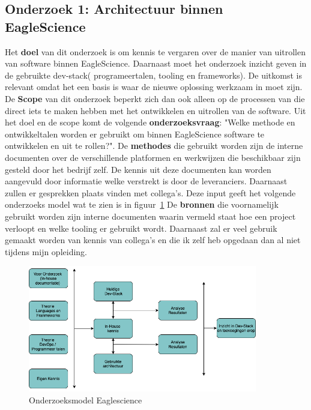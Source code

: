 \subsection{Onderzoek 1: Architectuur binnen EagleScience}\label{sec:onderzoeksmethode-architectuur-binnen-eaglescience}
Het \textbf{doel} van dit onderzoek is om kennis te vergaren over de manier van uitrollen van software binnen EagleScience. Daarnaast moet het onderzoek inzicht geven in de gebruikte dev-stack( programeertalen, tooling en frameworks). De uitkomst is relevant omdat het een basis is waar de nieuwe oplossing werkzaam in moet zijn. De \textbf{Scope} van dit onderzoek beperkt zich dan ook alleen op de processen van die direct iets te maken hebben met het ontwikkelen en uitrollen van de software. Uit het doel en de scope komt de volgende \textbf{onderzoeksvraag}: "Welke methode en ontwikkeltalen worden er gebruikt om binnen EagleScience software te ontwikkelen en uit te rollen?". De \textbf{methodes} die gebruikt worden zijn de interne documenten over de verschillende platformen en werkwijzen die beschikbaar zijn gesteld door het bedrijf zelf. De kennis uit deze documenten kan worden aangevuld door informatie welke verstrekt is door de leveranciers. Daarnaast zullen er gesprekken plaats vinden met collega's. Deze input geeft het volgende onderzoeks model wat te zien is in figuur~\ref{fig:OnderzoeksModelEaglescience}
De \textbf{bronnen} die voornamelijk gebruikt worden zijn interne documenten waarin vermeld staat hoe een project verloopt en welke tooling er gebruikt wordt. Daarnaast zal er veel gebruik gemaakt worden van kennis van collega's en die ik zelf heb opgedaan dan al niet tijdens mijn opleiding.
\begin{figure}[htbp]
    \myfloatalign
    \includegraphics[width=10cm]{gfx/OnderzoeksmodelES}
    \caption{Onderzoeksmodel Eaglescience}
    \label{fig:OnderzoeksModelEaglescience}
\end{figure}




